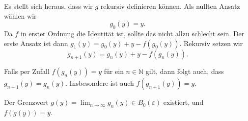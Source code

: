 \documentclass[../main.tex]{subfiles}
\begin{document}
Es stellt sich heraus, dass wir $g$ rekursiv definieren können.
Als nullten Ansatz wählen wir \[g_0(y) = y.\]
Da $f$ in erster Ordnung die Identität ist, sollte das
nicht allzu schlecht sein.
Der erste Ansatz ist dann $g_1(y) = g_0(y) + y - f(g_0(y))$.
Rekursiv setzen wir
\[
  g_{n+1}(y) = g_n(y) + y - f(g_n(y)).
\]

\begin{remark}
  Falls per Zufall $f(g_n(y)) = y$ für ein $n \in \mathbb{N}$
  gilt, dann folgt auch, dass
  \(
    g_{n+1}(y) = g_n(y)
  \).
  Insbesondere ist auch $f(g_{n+1}(y)) = y$.
\end{remark}

\begin{claim}
  Der Grenzwert $g(y) = \lim_{n \to \infty} g_n(y) \in B_{0}(\varepsilon)$
  existiert, und $f(g(y)) = y$.
\end{claim}
\end{document}
